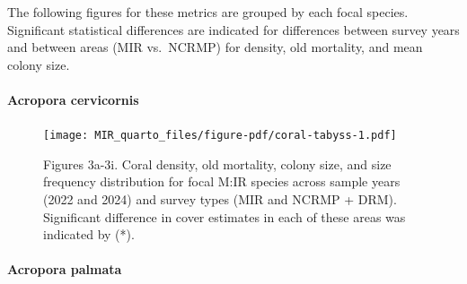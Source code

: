 \documentclass[
]{article}
\let\oldparagraph\paragraph
\renewcommand{\paragraph}[1]{\oldparagraph{#1}\mbox{}}
\begin{document}
The following figures for these metrics are grouped by each focal
species. Significant statistical differences are indicated for
differences between survey years and between areas (MIR vs.~NCRMP) for
density, old mortality, and mean colony size.

\hypertarget{acropora-cervicornis}{%
\paragraph{\texorpdfstring{ Acropora cervicornis
}{ Acropora cervicornis }}\label{acropora-cervicornis}}

\begin{figure}

{\centering \texttt{[image: MIR\_quarto\_files/figure-pdf/coral-tabyss-1.pdf]}

}

\caption{Figures 3a-3i. Coral density, old mortality, colony size, and
size frequency distribution for focal M:IR species across sample years
(2022 and 2024) and survey types (MIR and NCRMP + DRM). Significant
difference in cover estimates in each of these areas was indicated by
(*).}

\end{figure}

\hypertarget{acropora-palmata}{%
\paragraph{\texorpdfstring{ Acropora palmata
}{ Acropora palmata }}\label{acropora-palmata}}
\end{document}
